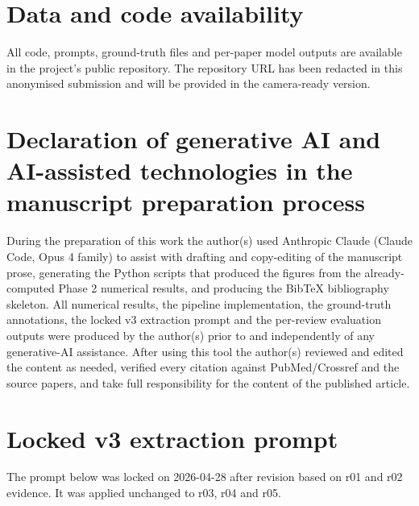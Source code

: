 \documentclass[a4paper,fleqn]{cas-sc}
\begin{document}
\section*{Data and code availability}
All code, prompts, ground-truth files and per-paper model outputs are
available in the project's public repository. The repository URL has
been redacted in this anonymised submission and will be provided in the
camera-ready version.

\section*{Declaration of generative AI and AI-assisted technologies in
the manuscript preparation process}

During the preparation of this work the author(s) used Anthropic Claude
(Claude Code, Opus 4 family) to assist with drafting and copy-editing of
the manuscript prose, generating the Python scripts that produced the
figures from the already-computed Phase 2 numerical results, and
producing the BibTeX bibliography skeleton. All numerical results,
the pipeline implementation, the ground-truth annotations, the locked
v3 extraction prompt and the per-review evaluation outputs were produced
by the author(s) prior to and independently of any generative-AI
assistance. After using this tool the author(s) reviewed and edited the
content as needed, verified every citation against PubMed/Crossref and
the source papers, and take full responsibility for the content of the
published article.




\appendix

\section{Locked v3 extraction prompt}\label{app:prompt}

The prompt below was locked on 2026-04-28 after revision based on r01
and r02 evidence. It was applied unchanged to r03, r04 and r05.
\end{document}
